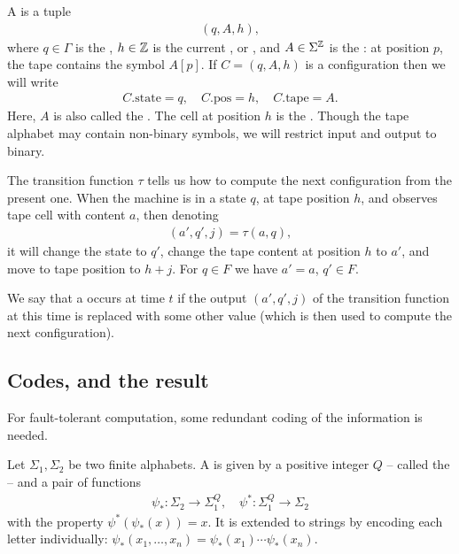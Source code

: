 \documentclass[12pt]{memoir}
\newcommand{\h}{h}
\newcommand{\pos}{\mathrm{pos}}
\newcommand{\state}{\mathrm{state}}
\newcommand{\tape}{\mathrm{tape}}
\begin{document}
    A  is a tuple
        \begin{align*}
             (q,A,\h),
        \end{align*}
    where \( q\in\Gamma \) is the , 
\( \h\in\bbZ \) is the current , or ,
and \( A\in\Sigma^{\mathbb{Z}} \) is the : 
at position \( p \), the tape contains the symbol \( A[p] \).
If \( C=(q,A,\h) \) is a configuration then we will write
        \begin{align*}
             C.\state=q,\quad C.\pos=\h, \quad C.\tape=A.
        \end{align*}
    Here, \( A \) is also called the .
    The cell at position \( \h \) is the  .
Though the tape alphabet may contain
non-binary symbols, we will restrict input and output to binary.

    The transition function \( \tau \) tells us how to compute the next
    configuration from the present one.
    When the machine is in a state \( q \), at tape position \( \h \), and
    observes tape cell with content \( a \), then denoting
         \begin{align*}
           (a',q',j)=\tau(a,q),
         \end{align*}
    it will change the state to \( q' \), change the
    tape content at position \( \h \) to \( a' \), and move to tape position to \( \h+j \).
    For \( q\in F \) we have \( a'=a \), \( q'\in F \).


\begin{definition}[Fault]\label{def:fault}
    We say that a  occurs at time \( t \) if the output \( (a',q',j) \) of the
    transition function at this time is replaced with some other value
    (which is then used to compute the next configuration).
\end{definition}


\subsection{Codes, and the result}

For fault-tolerant computation, some redundant coding of the information is needed.

\begin{definition}[Codes]\label{def:codes}
    Let \( \Sigma_{1},\Sigma_{2} \) be two finite alphabets.
    A  is given by a positive integer \( Q \) -- called
    the  -- and a pair of functions
    \begin{align*}
            \psi_{*} :\Sigma_{2}\to\Sigma_{1}^{Q},
            \quad
            \psi^{*}:\Sigma_{1}^{Q}\to\Sigma_{2}
    \end{align*}
    with the property \( \psi^{*}(\psi_{*}(x))=x \).
It is extended to strings by encoding each letter individually:
\( \psi_{*}(x_{1},\dots,x_{n})=\psi_{*}(x_{1})\dotsm\psi_{*}(x_{n}) \).
\end{definition}
\end{document}

